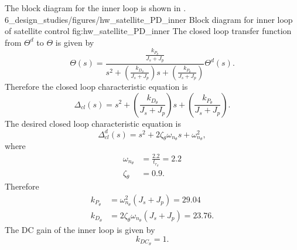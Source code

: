
The block diagram for the inner loop is shown in .
	{6_design_studies/figures/hw_satellite_PD_inner}
	{Block diagram for inner loop of satellite control}
	{fig:hw_satellite_PD_inner}
The closed loop transfer function from $\Theta^d$ to $\Theta$ is given by
\[
\Theta(s) = \frac{\frac{k_{P_\theta}}{J_s + J_p}}{s^2 +\left(\frac{k_{D_\theta}}{J_s + J_p}\right)s+\left(\frac{k_{P_\theta}}{J_s + J_p}\right)} \Theta^d(s).
\]
Therefore the closed loop characteristic equation is
\[
\Delta_{cl}(s) = s^2 +\left(\frac{k_{D_\theta}}{J_s + J_p}\right)s+\left(\frac{k_{P_\theta}}{J_s + J_p}\right).
\]
The desired closed loop characteristic equation is
\[
\Delta_{cl}^d(s) = s^2 + 2\zeta_{\theta}\omega_{n_\theta} s + \omega_{n_\theta}^2,
\]
where
\begin{align*}
\omega_{n_\theta} &= \frac{2.2}{t_{r_\theta}} = 2.2 \\
\zeta_{\theta} &= 0.9.
\end{align*}
Therefore
\begin{align*}
k_{P_\theta} &= \omega_{n_\theta}^2(J_s + J_p) = 29.04 \\
k_{D_\theta} &= 2\zeta_{\theta}\omega_{n_\theta}(J_s + J_p) = 23.76.
\end{align*}
The DC gain of the inner loop is given by
\[
k_{DC_{\theta}} = 1.
\]

